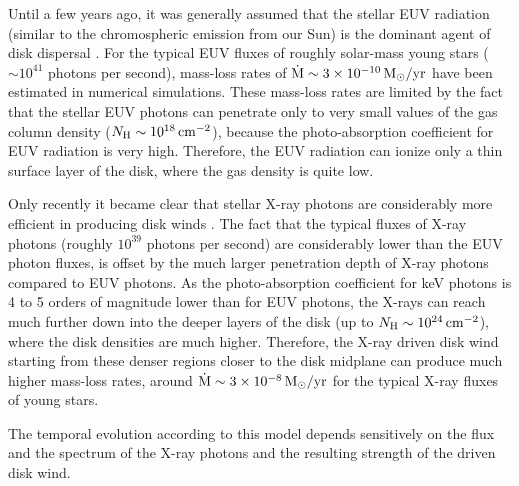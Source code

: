 \documentclass[10pt,fleqn,twoside]{article}
\begin{document}
Until a few years ago, it was generally assumed that the 
stellar EUV radiation (similar to the chromospheric emission from 
our Sun) is the dominant agent of disk dispersal \citep{Alexander06}.
For the typical EUV fluxes of roughly solar-mass young stars 
($\sim 10^{41}$ photons per second), mass-loss rates of 
$ \dot{\rm M} \sim 3 \times 10^{-10}\,\rm M_\odot/yr$
have been estimated in numerical simulations.
These mass-loss rates are limited by the fact that the stellar EUV photons
can penetrate only to very small values of the gas column density
($N_{\rm H} \sim  10^{18}\,\rm cm^{-2}$), 
because the photo-absorption coefficient for EUV radiation is very high. Therefore,
the EUV radiation  
can ionize only a thin surface layer of the disk, where the 
gas density is quite low. 


Only recently it became clear that stellar X-ray photons 
are considerably more efficient in producing 
disk winds \citep{Ercolano08a,Ercolano08b,Ercolano09}.
The fact that the typical fluxes of X-ray photons (roughly
 $10^{39}$ photons per second) are considerably lower than the EUV photon fluxes,
is offset by the much larger 
penetration depth of X-ray photons compared to EUV photons.
As the photo-absorption coefficient for keV photons
is 4 to 5  orders of magnitude lower than for EUV photons, the
X-rays can reach much further down into the deeper layers of the
disk (up to $N_{\rm H} \sim  10^{24}\,\rm cm^{-2}$), 
where the disk densities are much higher. 
Therefore, the X-ray driven 
disk wind starting from these denser regions closer to the
disk midplane can produce much higher mass-loss rates,
around  $ \dot{\rm M} \sim 3 \times 10^{-8}\,\rm M_\odot/yr$
for the typical X-ray fluxes of young stars.


The temporal evolution according to this model depends sensitively
on the flux and the spectrum of the X-ray photons
  and the resulting strength of the
driven disk wind.
\end{document}
